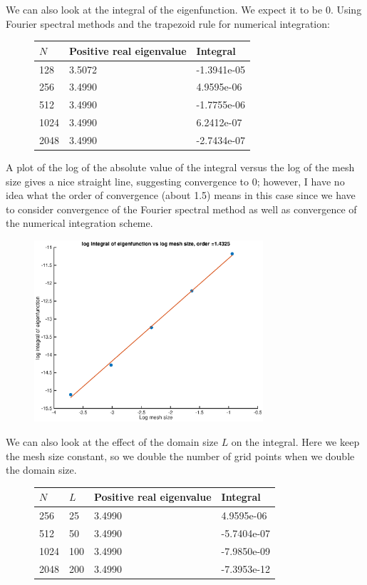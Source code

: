 \documentclass[12pt]{article}
\begin{document}
We can also look at the integral of the eigenfunction. We expect it to be 0. Using Fourier spectral methods and the trapezoid rule for numerical integration:

\begin{figure}[H]
\begin{tabular}{lll}
$N$    & Positive real eigenvalue      &  Integral     \\ \hline
  128  &        3.5072  &  -1.3941e-05 \\ 
  256  &        3.4990  &  4.9595e-06  \\ 
  512  &        3.4990  &  -1.7755e-06 \\ 
  1024 &        3.4990  &  6.2412e-07  \\
  2048 &        3.4990  &  -2.7434e-07 \\ 
\end{tabular}
\end{figure}
A plot of the log of the absolute value of the integral versus the log of the mesh size gives a nice straight line, suggesting convergence to 0; however, I have no idea what the order of convergence (about 1.5) means in this case since we have to consider convergence of the Fourier spectral method as well as convergence of the numerical integration scheme.
\begin{figure}[H]
\includegraphics[width=8.5cm]{1double1fouriereigenfnintegralN}
\end{figure}

We can also look at the effect of the domain size $L$ on the integral. Here we keep the mesh size constant, so we double the number of grid points when we double the domain size.

\begin{figure}[H]
\begin{tabular}{llll}
$N$    & $L$    & Positive real eigenvalue      &  Integral     \\ \hline
  256  &  25    &   3.4990  &  4.9595e-06  \\ 
  512  &  50    &   3.4990  &  -5.7404e-07 \\ 
  1024 &  100   &   3.4990  &  -7.9850e-09 \\
  2048 &  200   &   3.4990  &  -7.3953e-12 \\ 
\end{tabular}
\end{figure}
\end{document}
